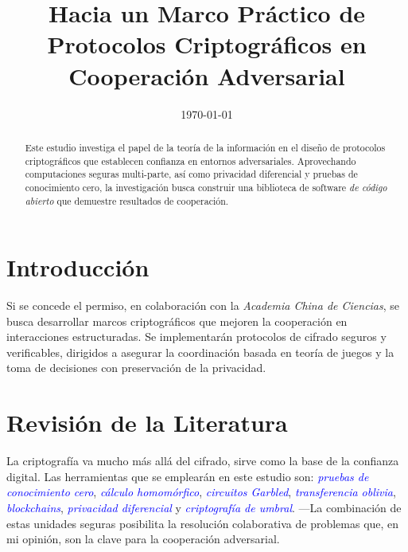 \documentclass[conference]{IEEEtran}
\date{\today}
\begin{document}
\title{Hacia un Marco Práctico de Protocolos Criptográficos en Cooperación Adversarial}
\author{
}

\maketitle

\begin{abstract}
Este estudio investiga el papel de la teoría de la información en el diseño de protocolos criptográficos que establecen confianza en entornos adversariales. 
Aprovechando computaciones seguras multi-parte, así como privacidad diferencial y pruebas de conocimiento cero, la investigación busca construir 
una biblioteca de software \textit{de código abierto} que demuestre resultados de cooperación.
\end{abstract}

\vspace{-5pt}
\section{Introducción}
Si se concede el permiso, en colaboración con la \textit{Academia China de Ciencias}, se busca desarrollar marcos criptográficos que mejoren la cooperación en interacciones estructuradas. 
Se implementarán protocolos de cifrado seguros y verificables, dirigidos a asegurar la coordinación basada en teoría de juegos y la toma de decisiones con preservación de la privacidad.

\vspace{-5pt}
\section{Revisión de la Literatura}
La criptografía va mucho más allá del cifrado, sirve como la base de la confianza digital. Las herramientas que se emplearán en este estudio son: 
\textcolor{blue}{\textit{pruebas de conocimiento cero}}, 
\textcolor{blue}{\textit{cálculo homomórfico}}, 
\textcolor{blue}{\textit{circuitos Garbled}}, 
\textcolor{blue}{\textit{transferencia oblivia}}, 
\textcolor{blue}{\textit{blockchains}}, 
\textcolor{blue}{\textit{privacidad diferencial}} y 
\textcolor{blue}{\textit{criptografía de umbral}}. 
---La combinación de estas unidades seguras posibilita la resolución colaborativa de problemas que, en mi opinión, son la clave para la cooperación adversarial.
\end{document}
